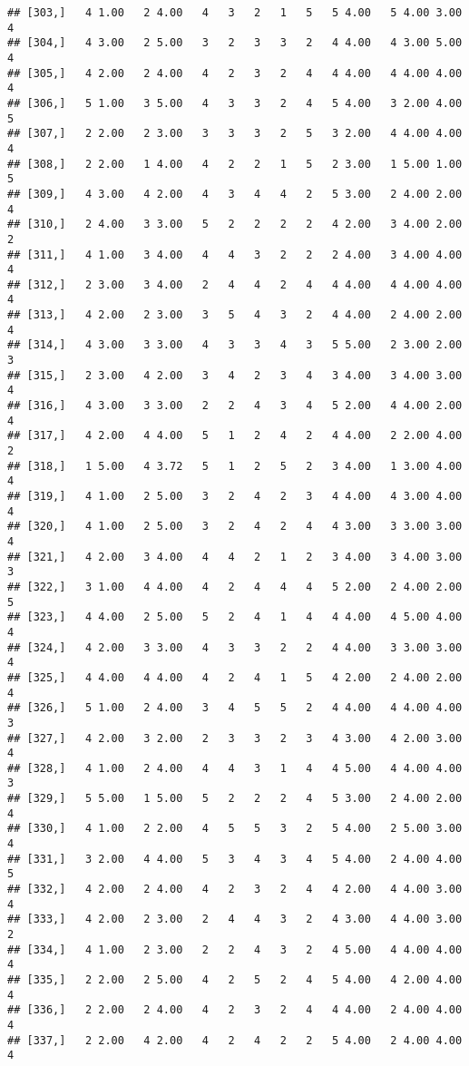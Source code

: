 \documentclass[]{article}
\begin{document}
\begin{verbatim}
## [303,]   4 1.00   2 4.00   4   3   2   1   5   5 4.00   5 4.00 3.00   4
## [304,]   4 3.00   2 5.00   3   2   3   3   2   4 4.00   4 3.00 5.00   4
## [305,]   4 2.00   2 4.00   4   2   3   2   4   4 4.00   4 4.00 4.00   4
## [306,]   5 1.00   3 5.00   4   3   3   2   4   5 4.00   3 2.00 4.00   5
## [307,]   2 2.00   2 3.00   3   3   3   2   5   3 2.00   4 4.00 4.00   4
## [308,]   2 2.00   1 4.00   4   2   2   1   5   2 3.00   1 5.00 1.00   5
## [309,]   4 3.00   4 2.00   4   3   4   4   2   5 3.00   2 4.00 2.00   4
## [310,]   2 4.00   3 3.00   5   2   2   2   2   4 2.00   3 4.00 2.00   2
## [311,]   4 1.00   3 4.00   4   4   3   2   2   2 4.00   3 4.00 4.00   4
## [312,]   2 3.00   3 4.00   2   4   4   2   4   4 4.00   4 4.00 4.00   4
## [313,]   4 2.00   2 3.00   3   5   4   3   2   4 4.00   2 4.00 2.00   4
## [314,]   4 3.00   3 3.00   4   3   3   4   3   5 5.00   2 3.00 2.00   3
## [315,]   2 3.00   4 2.00   3   4   2   3   4   3 4.00   3 4.00 3.00   4
## [316,]   4 3.00   3 3.00   2   2   4   3   4   5 2.00   4 4.00 2.00   4
## [317,]   4 2.00   4 4.00   5   1   2   4   2   4 4.00   2 2.00 4.00   2
## [318,]   1 5.00   4 3.72   5   1   2   5   2   3 4.00   1 3.00 4.00   4
## [319,]   4 1.00   2 5.00   3   2   4   2   3   4 4.00   4 3.00 4.00   4
## [320,]   4 1.00   2 5.00   3   2   4   2   4   4 3.00   3 3.00 3.00   4
## [321,]   4 2.00   3 4.00   4   4   2   1   2   3 4.00   3 4.00 3.00   3
## [322,]   3 1.00   4 4.00   4   2   4   4   4   5 2.00   2 4.00 2.00   5
## [323,]   4 4.00   2 5.00   5   2   4   1   4   4 4.00   4 5.00 4.00   4
## [324,]   4 2.00   3 3.00   4   3   3   2   2   4 4.00   3 3.00 3.00   4
## [325,]   4 4.00   4 4.00   4   2   4   1   5   4 2.00   2 4.00 2.00   4
## [326,]   5 1.00   2 4.00   3   4   5   5   2   4 4.00   4 4.00 4.00   3
## [327,]   4 2.00   3 2.00   2   3   3   2   3   4 3.00   4 2.00 3.00   4
## [328,]   4 1.00   2 4.00   4   4   3   1   4   4 5.00   4 4.00 4.00   3
## [329,]   5 5.00   1 5.00   5   2   2   2   4   5 3.00   2 4.00 2.00   4
## [330,]   4 1.00   2 2.00   4   5   5   3   2   5 4.00   2 5.00 3.00   4
## [331,]   3 2.00   4 4.00   5   3   4   3   4   5 4.00   2 4.00 4.00   5
## [332,]   4 2.00   2 4.00   4   2   3   2   4   4 2.00   4 4.00 3.00   4
## [333,]   4 2.00   2 3.00   2   4   4   3   2   4 3.00   4 4.00 3.00   2
## [334,]   4 1.00   2 3.00   2   2   4   3   2   4 5.00   4 4.00 4.00   4
## [335,]   2 2.00   2 5.00   4   2   5   2   4   5 4.00   4 2.00 4.00   4
## [336,]   2 2.00   2 4.00   4   2   3   2   4   4 4.00   2 4.00 4.00   4
## [337,]   2 2.00   4 2.00   4   2   4   2   2   5 4.00   2 4.00 4.00   4

\end{verbatim}
\end{document}
